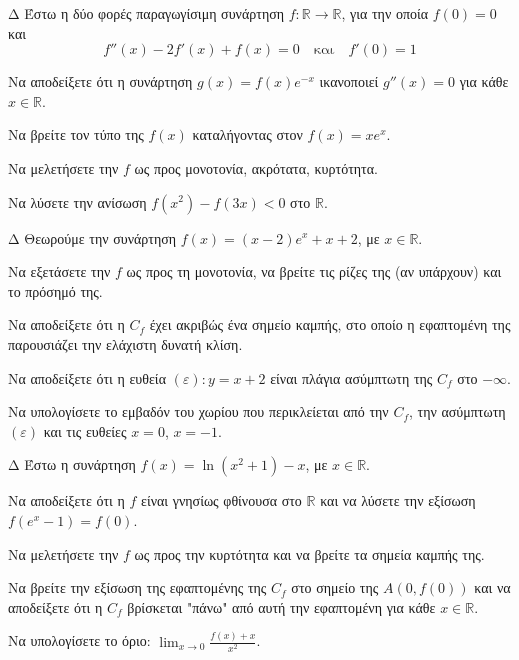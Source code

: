 \begin{thema}{Δ}
Έστω η δύο φορές παραγωγίσιμη συνάρτηση $f:\mathbb{R}\to\mathbb{R}$, για την οποία $f(0)=0$ και 
\[ f''(x) - 2f'(x) + f(x) = 0 \quad \text{και} \quad f'(0) = 1 \]
\begin{erwthma}
    \item Να αποδείξετε ότι η συνάρτηση $g(x) = f(x) e^{-x}$ ικανοποιεί $g''(x)=0$ για κάθε $x \in \mathbb{R}$.
    \item Να βρείτε τον τύπο της $f(x)$ καταλήγοντας στον $f(x) = x e^x$.
    \item Να μελετήσετε την $f$ ως προς μονοτονία, ακρότατα, κυρτότητα.
    \item Να λύσετε την ανίσωση $f(x^2) - f(3x) < 0$ στο $\mathbb{R}$.
\end{erwthma}
\end{thema}

\begin{thema}{Δ}
Θεωρούμε την συνάρτηση $f(x) = (x-2)e^x + x + 2$, με $x \in \mathbb{R}$.
\begin{erwthma}
    \item Να εξετάσετε την $f$ ως προς τη μονοτονία, να βρείτε τις ρίζες της (αν υπάρχουν) και το πρόσημό της.
    \item Να αποδείξετε ότι η $C_f$ έχει ακριβώς ένα σημείο καμπής, στο οποίο η εφαπτομένη της παρουσιάζει την ελάχιστη δυνατή κλίση.
    \item Να αποδείξετε ότι η ευθεία $(\varepsilon): y = x + 2$ είναι πλάγια ασύμπτωτη της $C_f$ στο $-\infty$.
    \item Να υπολογίσετε το εμβαδόν του χωρίου που περικλείεται από την $C_f$, την ασύμπτωτη $(\varepsilon)$ και τις ευθείες $x=0$, $x=-1$.
\end{erwthma}
\end{thema}

\begin{thema}{Δ}
Έστω η συνάρτηση $f(x) = \ln(x^2+1) - x$, με $x \in \mathbb{R}$.
\begin{erwthma}
    \item Να αποδείξετε ότι η $f$ είναι γνησίως φθίνουσα στο $\mathbb{R}$ και να λύσετε την εξίσωση $f(e^x - 1) = f(0)$.
    \item Να μελετήσετε την $f$ ως προς την κυρτότητα και να βρείτε τα σημεία καμπής της.
    \item Να βρείτε την εξίσωση της εφαπτομένης της $C_f$ στο σημείο της $A(0, f(0))$ και να αποδείξετε ότι η $C_f$ βρίσκεται "πάνω" από αυτή την εφαπτομένη για κάθε $x \in \mathbb{R}$.
    \item Να υπολογίσετε το όριο: $\displaystyle \lim_{x\to 0} \frac{f(x) + x}{x^2}$.
\end{erwthma}
\end{thema}

